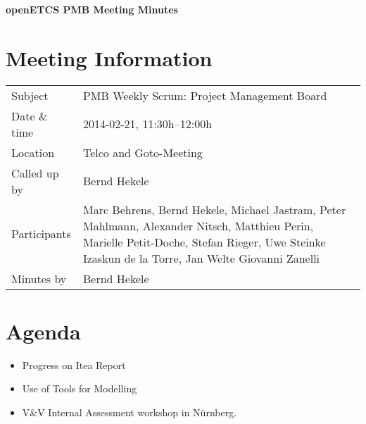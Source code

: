 \documentclass[a4paper, 11pt]{article}
\begin{document}
{\begin{center}\huge\bf openETCS PMB Meeting Minutes\end{center}}
\section{Meeting Information}

\renewcommand{\arraystretch}{1.5}
\begin{supertabular}{m{.2\textwidth}m{.8\textwidth}}
Subject & PMB Weekly Scrum: Project Management Board\\
Date \& time & 2014-02-21, 11:30h--12:00h\\
Location & Telco and Goto-Meeting\\
Called up by & Bernd Hekele\\
Participants &
Marc Behrens,
Bernd Hekele,
Michael Jastram,
Peter Mahlmann,
Alexander Nitsch,
Matthieu Perin,
Marielle Petit-Doche,
Stefan Rieger,
Uwe Steinke
Izaskun de la Torre,
Jan Welte
Giovanni Zanelli
\\

Minutes by & Bernd Hekele\\

\end{supertabular}
\renewcommand{\arraystretch}{1.0}


\section{{Agenda}}

\begin{itemize}
\item Progress on Itea Report
\item Use of Tools for Modelling
\item V\&V Internal Assessment workshop in N\"urnberg.\\

\end{itemize}
\end{document}
